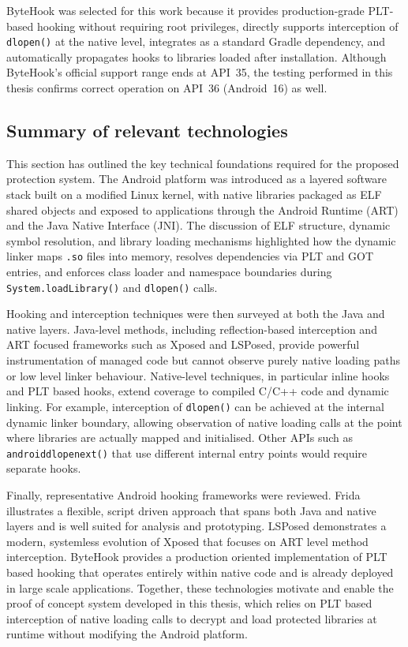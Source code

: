 \documentclass[11pt,a4paper]{report}
\renewcommand\_{{\textunderscore\allowbreak}}
\begin{document}
ByteHook was selected for this work because it provides production-grade PLT-based hooking without requiring root privileges, directly supports interception of \texttt{dlopen()} at the native level, integrates as a standard Gradle dependency, and automatically propagates hooks to libraries loaded after installation.  Although ByteHook's official support range ends at API~35, the testing performed in this thesis confirms correct operation on API~36 (Android~16) as well.

\subsection{Summary of relevant technologies}

This section has outlined the key technical foundations required for the proposed protection system. The Android platform was introduced as a layered software stack built on a modified Linux kernel, with native libraries packaged as ELF shared objects and exposed to applications through the Android Runtime (ART) and the Java Native Interface (JNI). The discussion of ELF structure, dynamic symbol resolution, and library loading mechanisms highlighted how the dynamic linker maps \texttt{.so} files into memory, resolves dependencies via PLT and GOT entries, and enforces class loader and namespace boundaries during \texttt{System.loadLibrary()} and \texttt{dlopen()} calls.

Hooking and interception techniques were then surveyed at both the Java and native layers. Java-level methods, including reflection-based interception and ART focused frameworks such as Xposed and LSPosed, provide powerful instrumentation of managed code but cannot observe purely native loading paths or low level linker behaviour. Native-level techniques, in particular inline hooks and PLT based hooks, extend coverage to compiled C/C++ code and dynamic linking. For example, interception of \texttt{dlopen()} can be achieved at the internal dynamic linker boundary, allowing observation of native loading calls at the point where libraries are actually mapped and initialised. Other APIs such as \texttt{android\_dlopen\_ext()} that use different internal entry points would require separate hooks.

Finally, representative Android hooking frameworks were reviewed. Frida illustrates a flexible, script driven approach that spans both Java and native layers and is well suited for analysis and prototyping. LSPosed demonstrates a modern, systemless evolution of Xposed that focuses on ART level method interception. ByteHook provides a production oriented implementation of PLT based hooking that operates entirely within native code and is already deployed in large scale applications. Together, these technologies motivate and enable the proof of concept system developed in this thesis, which relies on PLT based interception of native loading calls to decrypt and load protected libraries at runtime without modifying the Android platform.
\end{document}
